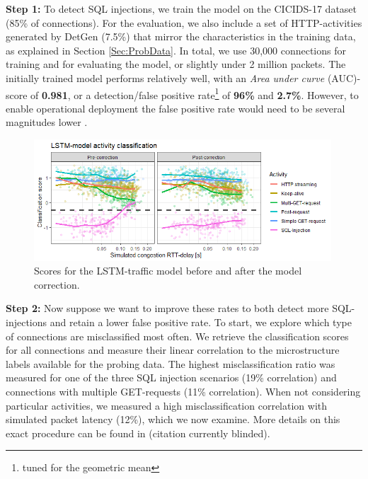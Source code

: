 \documentclass[runningheads]{llncs}
\begin{document}

\textbf{Step 1:} To detect SQL injections, we train the model on the CICIDS-17 dataset \cite{sharafaldin2018toward} (85\% of connections).
For the evaluation, we also include a set of HTTP-activities generated by DetGen (7.5\%) that mirror the characteristics in the training data, as explained in Section \ref{Sec:ProbData}. %
In total, we use 30,000 connections for training and for evaluating the model, or slightly under 2 million packets.
The initially trained model performs relatively well, with an \textit{Area under curve} (AUC)-score %
 of \textbf{0.981}, or a detection/false positive rate\footnote{tuned for the geometric mean} of \textbf{96\%} and \textbf{2.7\%}. However, to enable operational deployment the false positive rate would need to be several magnitudes lower \cite{mell2003overview}. 


\begin{figure}
\centering
\includegraphics[width=0.99\textwidth]{images/LSTM_classi.png}
\caption{Scores for the LSTM-traffic model before and after the model correction.}\label{fig:LSTM_exp}
\end{figure}


\textbf{Step 2:} Now suppose we want to improve these rates to both detect more SQL-injections and retain a lower false positive rate. To start, we explore which type of connections are misclassified most often. We retrieve the classification scores for all connections and measure their linear correlation to the microstructure labels available for the probing data. The highest misclassification ratio was measured for one of the three SQL injection scenarios  (19\% correlation) and connections with multiple GET-requests (11\% correlation). When not considering particular activities, we measured a high misclassification correlation with simulated packet latency (12\%), which we now examine. More details on this exact procedure can be found in (citation currently blinded).
\end{document}
